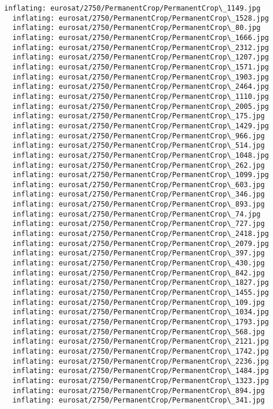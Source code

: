 \documentclass[11pt]{article}
\begin{document}
\begin{Verbatim}[commandchars=\\\{\}]
  inflating: eurosat/2750/PermanentCrop/PermanentCrop\_1149.jpg
  inflating: eurosat/2750/PermanentCrop/PermanentCrop\_1528.jpg
  inflating: eurosat/2750/PermanentCrop/PermanentCrop\_80.jpg
  inflating: eurosat/2750/PermanentCrop/PermanentCrop\_1666.jpg
  inflating: eurosat/2750/PermanentCrop/PermanentCrop\_2312.jpg
  inflating: eurosat/2750/PermanentCrop/PermanentCrop\_1207.jpg
  inflating: eurosat/2750/PermanentCrop/PermanentCrop\_1571.jpg
  inflating: eurosat/2750/PermanentCrop/PermanentCrop\_1903.jpg
  inflating: eurosat/2750/PermanentCrop/PermanentCrop\_2464.jpg
  inflating: eurosat/2750/PermanentCrop/PermanentCrop\_1110.jpg
  inflating: eurosat/2750/PermanentCrop/PermanentCrop\_2005.jpg
  inflating: eurosat/2750/PermanentCrop/PermanentCrop\_175.jpg
  inflating: eurosat/2750/PermanentCrop/PermanentCrop\_1429.jpg
  inflating: eurosat/2750/PermanentCrop/PermanentCrop\_966.jpg
  inflating: eurosat/2750/PermanentCrop/PermanentCrop\_514.jpg
  inflating: eurosat/2750/PermanentCrop/PermanentCrop\_1048.jpg
  inflating: eurosat/2750/PermanentCrop/PermanentCrop\_262.jpg
  inflating: eurosat/2750/PermanentCrop/PermanentCrop\_1099.jpg
  inflating: eurosat/2750/PermanentCrop/PermanentCrop\_603.jpg
  inflating: eurosat/2750/PermanentCrop/PermanentCrop\_346.jpg
  inflating: eurosat/2750/PermanentCrop/PermanentCrop\_893.jpg
  inflating: eurosat/2750/PermanentCrop/PermanentCrop\_74.jpg
  inflating: eurosat/2750/PermanentCrop/PermanentCrop\_727.jpg
  inflating: eurosat/2750/PermanentCrop/PermanentCrop\_2418.jpg
  inflating: eurosat/2750/PermanentCrop/PermanentCrop\_2079.jpg
  inflating: eurosat/2750/PermanentCrop/PermanentCrop\_397.jpg
  inflating: eurosat/2750/PermanentCrop/PermanentCrop\_430.jpg
  inflating: eurosat/2750/PermanentCrop/PermanentCrop\_842.jpg
  inflating: eurosat/2750/PermanentCrop/PermanentCrop\_1827.jpg
  inflating: eurosat/2750/PermanentCrop/PermanentCrop\_1455.jpg
  inflating: eurosat/2750/PermanentCrop/PermanentCrop\_109.jpg
  inflating: eurosat/2750/PermanentCrop/PermanentCrop\_1034.jpg
  inflating: eurosat/2750/PermanentCrop/PermanentCrop\_1793.jpg
  inflating: eurosat/2750/PermanentCrop/PermanentCrop\_568.jpg
  inflating: eurosat/2750/PermanentCrop/PermanentCrop\_2121.jpg
  inflating: eurosat/2750/PermanentCrop/PermanentCrop\_1742.jpg
  inflating: eurosat/2750/PermanentCrop/PermanentCrop\_2236.jpg
  inflating: eurosat/2750/PermanentCrop/PermanentCrop\_1484.jpg
  inflating: eurosat/2750/PermanentCrop/PermanentCrop\_1323.jpg
  inflating: eurosat/2750/PermanentCrop/PermanentCrop\_894.jpg
  inflating: eurosat/2750/PermanentCrop/PermanentCrop\_341.jpg

\end{Verbatim}
\end{document}
